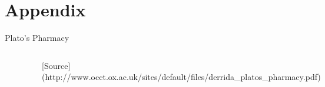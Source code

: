\documentclass[
  10pt,
  ignorenonframetext,
  aspectratio=169]{beamer}
\newif\ifbibliography
\begin{document}
\hypertarget{appendix}{%
\section*{Appendix}\label{appendix}}

\begin{frame}{Plato's Pharmacy}
\protect\hypertarget{platos-pharmacy}{}
\label{PHARMAKON}

\hyperlink{CONSIDERATIONS}{}

\medskip

\centering
\begin{columns}
\centering
\begin{column}{0.5\linewidth}
\centering
\includegraphics[width=0.9\linewidth]{logos.png}
\end{column}

\begin{column}{0.5\linewidth}
\centering
\includegraphics[width=0.9\linewidth]{thamus.png}
\end{column}

\begin{column}{0.5\linewidth}

\end{column}

\medskip

[Source](http://www.occt.ox.ac.uk/sites/default/files/derrida\_platos\_pharmacy.pdf)

\end{columns}
\end{frame}

\begin{frame}[allowframebreaks]{}
  \bibliographytrue
  
\end{frame}
\end{document}
